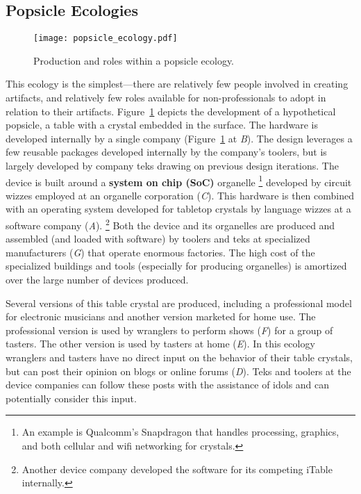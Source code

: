 \subsection{Popsicle Ecologies}
%
\begin{figure}[b!]
  \centering
    \texttt{[image: popsicle\_ecology.pdf]}
  \caption{Production and roles within a popsicle ecology.}
  \label{fig:popsicle_ecology}
\end{figure}
%
This ecology is the simplest---there are relatively few people involved in creating artifacts, and relatively few roles available for non{}-professionals to adopt in relation to their artifacts.
Figure~\ref{fig:popsicle_ecology} depicts the development of a hypothetical popsicle, a table with a crystal embedded in the surface.
The hardware is developed internally by a single company (Figure~\ref{fig:popsicle_ecology} at \emph{B}). The design leverages a few reusable packages developed internally by the company's toolers, but is largely developed by company teks drawing on previous design iterations. The device is built around  a \textbf{system on chip (SoC)} organelle%
\footnote{An example is Qualcomm's Snapdragon that handles processing, graphics, and both cellular and wifi networking for crystals.}
developed by circuit wizzes employed at an organelle corporation (\emph{C}).
This hardware is then combined with an operating system developed for tabletop crystals by language wizzes at a software company (\emph{A}).%
\footnote{Another device company developed the software for its competing iTable internally.} 
Both the device and its organelles are produced and assembled (and loaded with software) by toolers and teks at specialized manufacturers (\emph{G}) that operate enormous factories. 
The high cost of the specialized buildings and tools (especially for producing organelles) is amortized over the large number of devices produced.

Several versions of this table crystal are produced, including a professional model for electronic musicians and another version marketed for home use. The professional version is used by wranglers to perform shows (\emph{F}) for a group of tasters. The other version is used by tasters at home (\emph{E}). In this ecology wranglers and tasters have no direct input on the behavior of their table crystals, but can post their opinion on blogs or online forums (\emph{D}). Teks and toolers at the device companies can follow these posts with the assistance of idols and can potentially consider this input.

